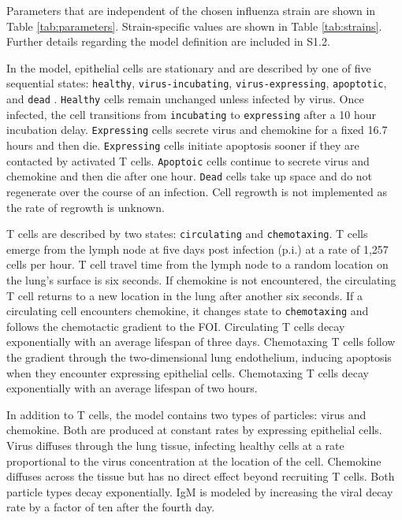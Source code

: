 \documentclass[10pt]{article}
\begin{document}
Parameters that are independent of the chosen influenza strain are shown in Table \ref{tab:parameters}.  Strain-specific values are shown in Table \ref{tab:strains}.  Further details regarding the model definition are included in S1.2.

In the model, epithelial cells are stationary and are described by one of five sequential states: \texttt{healthy}, \texttt{virus-incubating}, \texttt{virus-expressing}, \texttt{apoptotic}, and \texttt{dead} \cite{bachem1996simulated, Beauchemin2005, Mitchell2011}. \texttt{Healthy} cells remain unchanged unless infected by virus. Once infected, the cell transitions from \texttt{incubating} to \texttt{expressing} after a 10 hour incubation delay. \texttt{Expressing} cells secrete virus and chemokine for a fixed 16.7 hours and then die. \texttt{Expressing} cells initiate apoptosis sooner if they are contacted by activated T cells. \texttt{Apoptoic} cells continue to secrete virus and chemokine and then die after one hour. \texttt{Dead} cells take up space and do not regenerate over the course of an infection.  Cell regrowth is not implemented as the rate of regrowth is unknown. 

T cells are described by two states: \texttt{circulating} and \texttt{chemotaxing}.    T cells emerge from the lymph node at five days post infection (p.i.) at a rate of 1,257 cells per hour. T cell travel time from the lymph node to a random location on the lung's surface is six seconds.  If chemokine is not encountered, the circulating T cell returns to a new location in the lung after another six seconds.  If a circulating cell encounters chemokine, it changes state to \texttt{chemotaxing} and follows the chemotactic gradient to the FOI. Circulating T cells decay exponentially with an average lifespan of three days.  Chemotaxing T cells follow the gradient through the two-dimensional lung endothelium, inducing apoptosis when they encounter expressing epithelial cells. Chemotaxing T cells decay exponentially with an average lifespan of two hours.

In addition to T cells, the model contains two types of particles: virus and chemokine. Both are produced at constant rates by expressing epithelial cells.  Virus diffuses through the lung tissue, infecting healthy cells at a rate proportional to the virus concentration at the location of the cell. Chemokine diffuses across the tissue but has no direct effect beyond recruiting T cells. Both particle types decay exponentially.  IgM is modeled by increasing the viral decay rate by a factor of ten after the fourth day.
\end{document}
